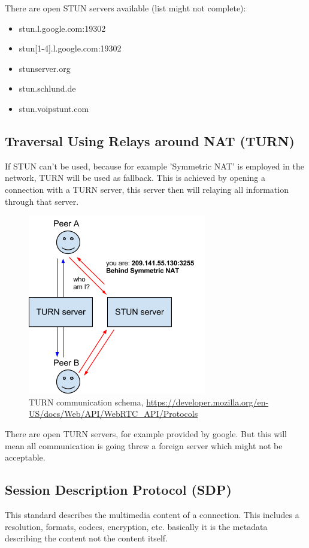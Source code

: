 There are open STUN servers available (list might not complete):
\begin{itemize}
	\item stun.l.google.com:19302
	\item stun[1-4].l.google.com:19302
	\item stunserver.org
	\item stun.schlund.de
	\item stun.voipstunt.com
\end{itemize}

\subsection{Traversal Using Relays around NAT (TURN)}
If STUN can't be used, because for example 'Symmetric NAT' is employed in the network, TURN will be used as fallback. This is achieved by opening a connection with a TURN server, this server then will relaying all information through that server.

\begin{figure}[H]
	\includegraphics[scale=0.5]{images/webrtc-turn.png}
	\centering
	\caption{TURN communication schema, \url{https://developer.mozilla.org/en-US/docs/Web/API/WebRTC_API/Protocols}}
	\label{fig:TURN}
\end{figure}

There are open TURN servers, for example provided by google. But this will mean all communication is going threw a foreign server which might not be acceptable.

\subsection{Session Description Protocol (SDP)}
This standard describes the multimedia content of a connection. This includes a resolution, formats, codecs, encryption, etc. basically it is the metadata describing the content not the content itself.

